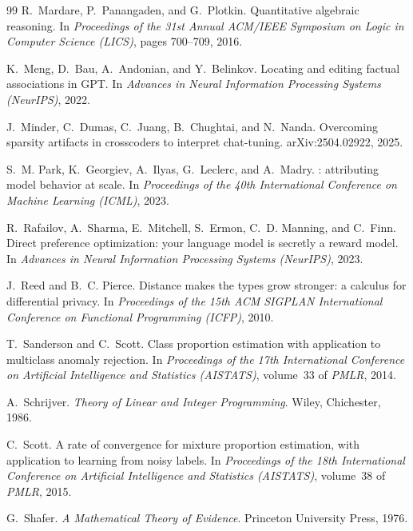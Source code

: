 \documentclass[11pt]{article}
\theoremstyle{definition}
\theoremstyle{remark}
\begin{document}
\begin{thebibliography}{99}
R.~Mardare, P.~Panangaden, and G.~Plotkin.
\newblock Quantitative algebraic reasoning.
\newblock In \emph{Proceedings of the 31st Annual ACM/IEEE Symposium on Logic in Computer Science
  (LICS)}, pages 700--709, 2016.

K.~Meng, D.~Bau, A.~Andonian, and Y.~Belinkov.
\newblock Locating and editing factual associations in {GPT}.
\newblock In \emph{Advances in Neural Information Processing Systems (NeurIPS)}, 2022.

J.~Minder, C.~Dumas, C.~Juang, B.~Chughtai, and N.~Nanda.
\newblock Overcoming sparsity artifacts in crosscoders to interpret chat-tuning.
\newblock arXiv:2504.02922, 2025.

S.~M. Park, K.~Georgiev, A.~Ilyas, G.~Leclerc, and A.~Madry.
: attributing model behavior at scale.
\newblock In \emph{Proceedings of the 40th International Conference on Machine Learning (ICML)}, 2023.

R.~Rafailov, A.~Sharma, E.~Mitchell, S.~Ermon, C.~D. Manning, and C.~Finn.
\newblock Direct preference optimization: your language model is secretly a reward model.
\newblock In \emph{Advances in Neural Information Processing Systems (NeurIPS)}, 2023.

J.~Reed and B.~C. Pierce.
\newblock Distance makes the types grow stronger: a calculus for differential privacy.
\newblock In \emph{Proceedings of the 15th ACM SIGPLAN International Conference on Functional
  Programming (ICFP)}, 2010.

T.~Sanderson and C.~Scott.
\newblock Class proportion estimation with application to multiclass anomaly rejection.
\newblock In \emph{Proceedings of the 17th International Conference on Artificial Intelligence and
  Statistics (AISTATS)}, volume~33 of \emph{PMLR}, 2014.

A.~Schrijver.
\newblock \emph{Theory of Linear and Integer Programming}.
\newblock Wiley, Chichester, 1986.

C.~Scott.
\newblock A rate of convergence for mixture proportion estimation, with application to learning from
  noisy labels.
\newblock In \emph{Proceedings of the 18th International Conference on Artificial Intelligence and
  Statistics (AISTATS)}, volume~38 of \emph{PMLR}, 2015.

G.~Shafer.
\newblock \emph{A Mathematical Theory of Evidence}.
\newblock Princeton University Press, 1976.


\end{thebibliography}
\end{document}
